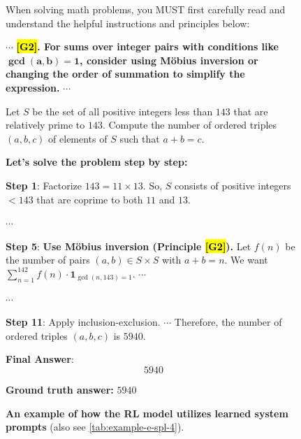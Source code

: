 \documentclass{article}
\theoremstyle{plain}
\theoremstyle{definition}
\theoremstyle{remark}
\begin{document}
\begin{figure}[t]
\centering
\caption{\textbf{An example of how the RL model utilizes learned system prompts} (also see \autoref{tab:example-e-spl-4}).}
\begin{runcard}[title={Example of How E-SPL Shapes Model Behavior}]

\medskip

\begin{runbox}[title={\textbf{Learned System Prompt}}]
When solving math problems, you MUST first carefully read and understand the helpful instructions and principles below:

$\cdots$ \quad \textbf{\color{Brown}\hl{{[G2]}}. For sums over integer pairs with conditions like $\boldsymbol{\gcd(a,b)=1}$, consider using Möbius inversion or changing the order of summation to simplify the expression.} \quad $\cdots$

\end{runbox}

\begin{runbox}[title={Problem}]
Let $S$ be the set of all positive integers less than $143$ that are relatively prime to $143$. Compute the number of ordered triples $(a,b,c)$ of elements of $S$ such that $a+b=c$.

\end{runbox}

\begin{runbox}[title={Model Output}]

\textbf{Let's solve the problem step by step:}

\textbf{Step 1}: Factorize \( 143 = 11 \times 13 \). So, \( S \) consists of positive integers \( < 143 \) that are coprime to both $11$ and $13$.

\quad $\cdots$

\textbf{Step 5}: {\textbf{\color{Brown}Use Möbius inversion (Principle \hl{[G2]}).} Let \( f(n) \) be the number of pairs \( (a, b) \in S \times S \) with \( a + b = n \). We want \( \sum_{n=1}^{142} f(n) \cdot \mathbf{1}_{\gcd(n,143)=1} \). \quad $\cdots$}

\quad $\cdots$

\textbf{Step 11}: Apply inclusion-exclusion. \quad $\cdots$ \quad Therefore, the number of ordered triples $(a,b,c)$ is $5940$.

\textbf{Final Answer}:
\[
\boxed{5940}
\]

\end{runbox}

\textbf{Ground truth answer:} $5940$
\end{runcard}
\label{tab:example-e-spl-4-short}
\end{figure}
\end{document}
